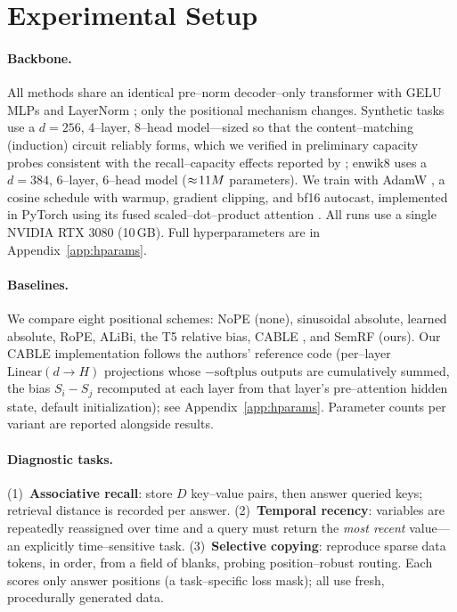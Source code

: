 \documentclass[11pt]{article}
\begin{document}
\section{Experimental Setup}
\label{sec:setup}

\paragraph{Backbone.} All methods share an identical pre--norm decoder--only
transformer \citep{vaswani2017attention,radford2019language} with GELU MLPs
\citep{hendrycks2016gaussian} and LayerNorm \citep{ba2016layer}; only the
positional mechanism changes. Synthetic tasks use a $d\!=\!256$, 4--layer,
8--head model---sized so that the content--matching (induction) circuit reliably
forms, which we verified in preliminary capacity probes consistent with the
recall--capacity effects reported by \citet{arora2023zoology}; enwik8 uses a
$d\!=\!384$, 6--layer, 6--head model ($\approx\!11M{}$ parameters).
We train with AdamW \citep{loshchilov2019decoupled}, a cosine schedule with
warmup, gradient clipping, and bf16 autocast, implemented in PyTorch
\citep{paszke2019pytorch} using its fused scaled--dot--product attention
\citep{dao2022flashattention}. All runs use a single NVIDIA RTX 3080 (10\,GB).
Full hyperparameters are in Appendix~\ref{app:hparams}.

\paragraph{Baselines.} We compare eight positional schemes: NoPE (none),
sinusoidal absolute, learned absolute, RoPE, ALiBi, the T5 relative bias,
CABLE \citep{veisi2025cable}, and SemRF (ours). Our CABLE implementation
follows the authors' reference code (per--layer $\mathrm{Linear}(d \to H)$
projections whose $-\mathrm{softplus}$ outputs are cumulatively summed, the
bias $S_i - S_j$ recomputed at each layer from that layer's pre--attention
hidden state, default initialization); see Appendix~\ref{app:hparams}.
Parameter counts per variant are reported alongside results.

\paragraph{Diagnostic tasks.} (1)~\textbf{Associative recall}: store $D$
key--value pairs, then answer queried keys; retrieval distance is recorded per
answer. (2)~\textbf{Temporal recency}: variables are repeatedly reassigned over
time and a query must return the \emph{most recent} value---an explicitly
time--sensitive task. (3)~\textbf{Selective copying}: reproduce sparse data
tokens, in order, from a field of blanks, probing position--robust routing. Each
scores only answer positions (a task--specific loss mask); all use fresh,
procedurally generated data.
\end{document}
